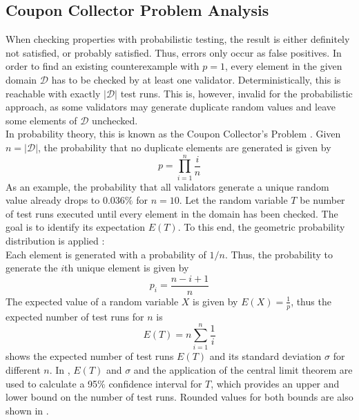 \subsection{Coupon Collector Problem Analysis}
When checking properties with probabilistic testing, the result is either definitely not satisfied, or probably satisfied. Thus, errors only occur as false positives. In order to find an existing counterexample with $p = 1$, every element in the given domain $\mathcal{D}$ has to be checked by at least one validator. Deterministically, this is reachable with exactly $|\mathcal{D}|$ test runs. This is, however, invalid for the probabilistic approach, as some validators may generate duplicate random values and leave some elements of $\mathcal{D}$ unchecked. \\
In probability theory, this is known as the Coupon Collector's Problem \cite{croucher_collecting_2006}. Given $n = |\mathcal{D}|$, the probability that no duplicate elements are generated is given by
\begin{equation*}
    p = \prod_{i=1}^{n} \frac{i}{n}
\end{equation*}
As an example, the probability that all validators generate a unique random value already drops to $0.036\%$ for $n = 10$. Let the random variable $T$ be number of test runs executed until every element in the domain has been checked. The goal is to identify its expectation $E(T)$. To this end, the geometric probability distribution is applied \cite{croucher_collecting_2006}:\\
Each element is generated with a probability of $1/n$. Thus, the probability to generate the $i$th unique element is given by 
\begin{equation}
    p_i = \frac{n-i+1}{n}
\end{equation}
The expected value of a random variable $X$ is given by $E(X) = \frac{1}{p}$\cite{croucher_collecting_2006}, thus the expected number of test runs for $n$ is 
\begin{equation}
E(T) = n \sum_{i=1}^{n} \frac{1}{i}
\end{equation}
 shows the expected number of test runs $E(T)$ and its standard deviation $\sigma$ for different $n$. In \cite{croucher_collecting_2006}, $E(T)$ and $\sigma$ and the application of the central limit theorem are used to calculate a 95\% confidence interval for $T$, which provides an upper and lower bound on the number of test runs. Rounded values for both bounds are also shown in .
